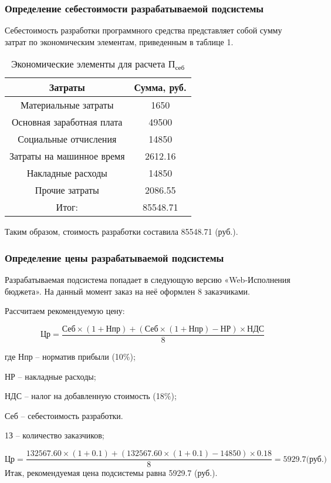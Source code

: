 \documentclass[a4paper]{extarticle}
\begin{document}
\subsubsection{Определение себестоимости разрабатываемой подсистемы}
Себестоимость разработки программного средства представляет собой сумму затрат по экономическим элементам, приведенным в таблице 1.\par
\begin{table}[H]
\caption{Экономические элементы для расчета $\text{П}_\text{себ}$}
\centering
  \begin{tabular}{|c|c|}
  \hline
  Затраты & Сумма, руб. \\\hline
  Материальные затраты & 1650 \\\hline
  Основная заработная плата & 49500 \\\hline
  Социальные отчисления & 14850 \\\hline
  Затраты на машинное время & 2612.16 \\\hline
  Накладные расходы & 14850 \\\hline
  Прочие затраты & 2086.55 \\\hline
  Итог: & 85548.71 \\
  \hline
  \end{tabular}
\end{table}\par
Таким образом, стоимость разработки составила 85548.71 (руб.).\par

\subsubsection{Определение цены разрабатываемой подсистемы}
Разрабатываемая подсистема попадает в следующую версию «Web-Исполнения бюджета». На данный момент заказ на неё оформлен 8 заказчиками.\par
Рассчитаем рекомендуемую цену:\par
\begin{equation}
\label{form9}
	\text{Цр}=\frac{\text{Себ}\times (1+\text{Нпр})+(\text{Себ}\times(1+\text{Нпр})-\text{НР})\times \text{НДС}}{8}
\end{equation}\par\vspace{1cm}
где Нпр – норматив прибыли (10\%);\par
НР – накладные расходы;\par
НДС – налог на добавленную стоимость (18\%);\par
Себ – себестоимость разработки.\par
1З – количество заказчиков;\par
\begin{equation}
\label{form9}
	\text{Цр}=\frac{132567.60\times (1+0.1)+(132567.60\times (1+0.1)-14850)\times 0.18}{8}=5929.7\text{(руб.)}
\end{equation}
Итак, рекомендуемая цена подсистемы равна 5929.7 (руб.).\par
\end{document}
